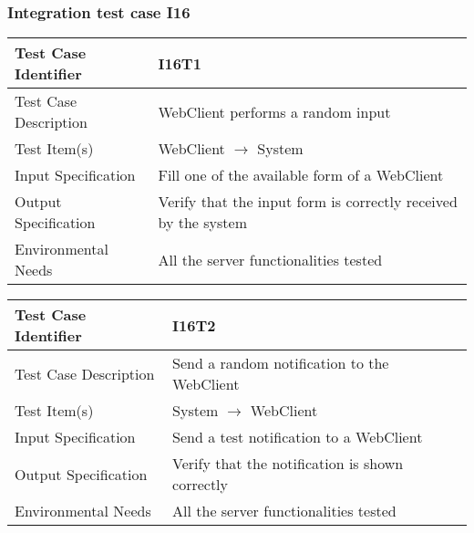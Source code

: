 		\subsubsection{Integration test case I16}
		\begin{center}
			\begin{tabular}{ |l p{10cm}| } \hline
				Test Case Identifier & I16T1\\ \hline
				Test Case Description & WebClient performs a random input  \\ \hline
				Test Item(s) & WebClient $\rightarrow$ System \\ \hline
				Input Specification & Fill one of the available form of a WebClient \\ \hline
				Output Specification & Verify that the input form is correctly received by the system \\ \hline
				Environmental Needs & All the server functionalities tested \\ \hline
			\end{tabular}
		\end{center}
		\vspace{1cm}
		\begin{center}
			\begin{tabular}{ |l p{10cm}| } \hline
				Test Case Identifier & I16T2 \\ \hline
				Test Case Description & Send a random notification to the WebClient \\ \hline
				Test Item(s) & System $\rightarrow$ WebClient \\ \hline
				Input Specification & Send a test notification to a WebClient \\ \hline
				Output Specification & Verify that the notification is shown correctly \\ \hline
				Environmental Needs & All the server functionalities tested \\ \hline
			\end{tabular}
		\end{center}
